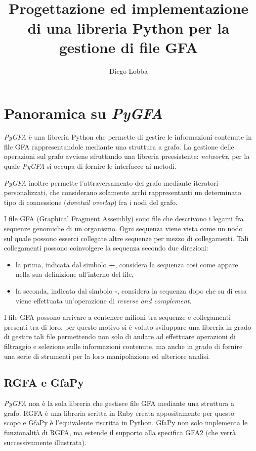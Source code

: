 \documentclass[11pt, a4paper]{book}
\title{\pygfa \\
	Progettazione ed implementazione di una libreria Python per la gestione
	di file GFA}
\author{Diego Lobba}
\newcommand {\pygfa} {\textit{PyGFA }}
\begin{document}


\tableofcontents
\listoffigures

\chapter{Panoramica su \pygfa}
\pygfa è una libreria Python che permette di gestire le informazioni
contenute in file GFA rappresentandole mediante una struttura a grafo.
La gestione delle operazioni sul grafo avviene sfruttando una libreria
preesistente: \emph{networkx}\cite{networkx}, per la quale \pygfa si occupa di fornire
le interfacce ai metodi.

\pygfa inoltre permette l'attraversamento del grafo mediante iteratori
personalizzati, che considerano solamente archi rappresentanti un
determinato tipo di connessione (\emph{dovetail overlap}) fra i nodi del
grafo.

I file GFA\cite{gfa_spec} (Graphical Fragment Assembly) sono file che descrivono	
i legami fra sequenze genomiche di un organismo. Ogni sequenza
viene vista come un nodo sul quale possono esserci collegate altre
sequenze per mezzo di collegamenti. Tali collegamenti possono
coinvolgere la sequenza secondo due direzioni:
\begin{itemize}
	\item la prima, indicata dal simbolo \textbf{+}, considera la
	sequenza così come appare nella sua definizione all'interno del file,
	\item la seconda, indicata dal simbolo \textbf{-}, considera la
	sequenza dopo che su di essa viene effettuata un'operazione di
	\emph{reverse and complement}.
\end{itemize}

I file GFA possono arrivare a contenere milioni tra sequenze e collegamenti
presenti tra di loro, per questo motivo si è voluto sviluppare una libreria
in grado di gestire tali file permettendo non solo di andare ad effettuare
operazioni di filtraggio e selezione sulle informazioni contenute, ma
anche in grado di fornire una serie di strumenti per la loro
manipolazione ed ulteriore analisi.

\section{RGFA e GfaPy}
\pygfa non è la sola libreria che gestisce file GFA mediante una struttura a grafo.
RGFA è una libreria scritta in Ruby creata appositamente per questo scopo e GfaPy
è l'equivalente riscritta in Python. GfaPy non solo implementa le funzionalità di RGFA,
ma estende il supporto alla specifica GFA2 (che verrà successivamente illustrata).
\end{document}
